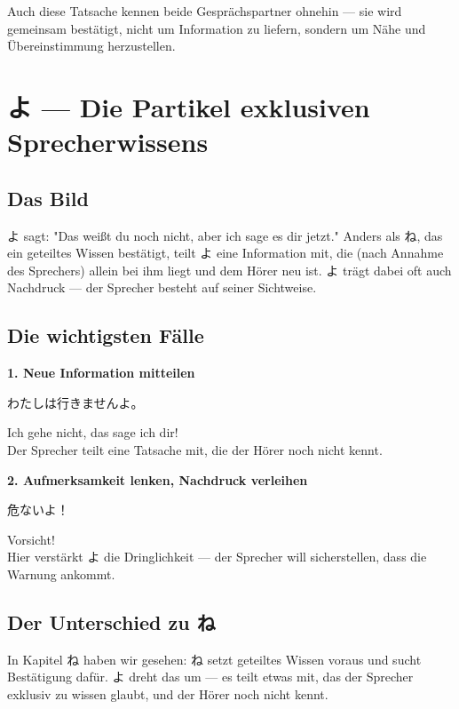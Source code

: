 \documentclass[12pt]{book}
\begin{document}
Auch diese Tatsache kennen beide Gesprächspartner ohnehin — sie wird gemeinsam bestätigt, nicht um Information zu liefern, sondern um Nähe und Übereinstimmung herzustellen.


\chapter{よ — Die Partikel exklusiven Sprecherwissens}

\section*{Das Bild}

よ sagt: "Das weißt du noch nicht, aber ich sage es dir jetzt." Anders als ね, das ein geteiltes Wissen bestätigt, teilt よ eine Information mit, die (nach Annahme des Sprechers) allein bei ihm liegt und dem Hörer neu ist. よ trägt dabei oft auch Nachdruck — der Sprecher besteht auf seiner Sichtweise.

\section*{Die wichtigsten Fälle}

\textbf{1. Neue Information mitteilen}
\par\quad わたしは行きませんよ。\\
\par\quad Ich gehe nicht, das sage ich dir!\\

Der Sprecher teilt eine Tatsache mit, die der Hörer noch nicht kennt.

\textbf{2. Aufmerksamkeit lenken, Nachdruck verleihen}
\par\quad 危ないよ！\\
\par\quad Vorsicht!\\

Hier verstärkt よ die Dringlichkeit — der Sprecher will sicherstellen, dass die Warnung ankommt.

\section*{Der Unterschied zu ね}

In Kapitel ね haben wir gesehen: ね setzt geteiltes Wissen voraus und sucht Bestätigung dafür. よ dreht das um — es teilt etwas mit, das der Sprecher exklusiv zu wissen glaubt, und der Hörer noch nicht kennt.
\end{document}
